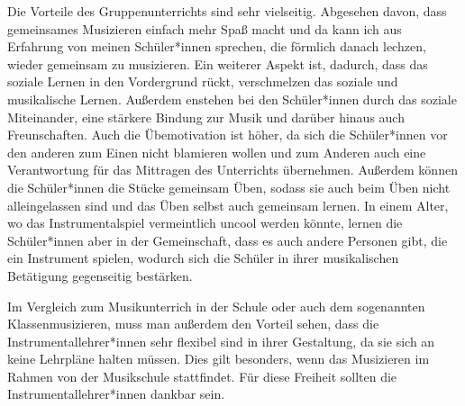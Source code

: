 Die Vorteile des Gruppenunterrichts sind sehr vielseitig. Abgesehen davon, dass
gemeinsames Musizieren einfach mehr Spaß macht und da kann ich aus Erfahrung von
meinen Schüler*innen sprechen, die förmlich danach lechzen, wieder gemeinsam zu
musizieren. Ein weiterer Aspekt ist, dadurch, dass das soziale Lernen in den
Vordergrund rückt, verschmelzen das soziale und musikalische Lernen. Außerdem
enstehen bei den Schüler*innen durch das soziale Miteinander, eine stärkere
Bindung zur Musik und darüber hinaus auch Freunschaften. Auch die
Übemotivation ist höher, da sich die Schüler*innen vor den anderen zum Einen nicht
blamieren wollen und zum Anderen auch eine Verantwortung für das Mittragen des
Unterrichts übernehmen. Außerdem können die Schüler*innen die Stücke gemeinsam Üben,
sodass sie auch beim Üben nicht alleingelassen sind und das Üben selbst auch
gemeinsam lernen. In einem Alter, wo das Instrumentalspiel vermeintlich uncool
werden könnte, lernen die Schüler*innen aber in der Gemeinschaft, dass es auch
andere Personen gibt, die ein Instrument spielen, wodurch sich die Schüler in
ihrer musikalischen Betätigung gegenseitig bestärken.
\autocite{ernst:die_zukunftsfaehige_musikschule}

Im Vergleich zum Musikunterrich in der Schule oder auch dem sogenannten
Klassenmusizieren, muss man außerdem den Vorteil sehen, dass die
Instrumentallehrer*innen sehr flexibel sind in ihrer Gestaltung, da sie sich an keine
Lehrpläne halten müssen. Dies gilt besonders, wenn das Musizieren im Rahmen von
der Musikschule stattfindet. Für diese Freiheit sollten die Instrumentallehrer*innen
dankbar sein.



